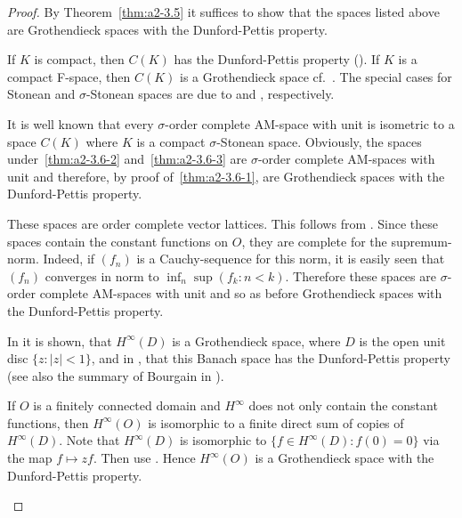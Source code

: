 \begin{proof}
By Theorem~\ref{thm:a2-3.5}   it suffices to show that the spaces listed above are Grothendieck spaces with the Dunford-Pettis property.
\begin{description}[style=standard, wide, labelindent=.25em]
		
\item[\ref{thm:a2-3.6-1}] 
	If\/ $K$ is compact, then $C(K)$ has the Dunford-Pettis property (\cf \textcite[Théorème 4]{grothendieck:1953}).
	If\/ $K$ is a compact F-space, then $C(K)$ is a Grothendieck space cf.~\textcite[Theorem 2.5]{seever:1968}. 
	The special cases for Stonean and $\sigma$-Stonean spaces are due to \textcite[Théorème 9]{grothendieck:1953} and \textcite{ando:1961},  respectively.
		
\item[\ref{thm:a2-3.6-2} and~\ref{thm:a2-3.6-3} ] It is well known that every $\sigma$-order complete AM-space with unit is isometric to a space $C(K)$ where $K$ is a compact $\sigma$-Stonean space.
Obviously, the spaces under~\ref{thm:a2-3.6-2}   and~\ref{thm:a2-3.6-3}  are $\sigma$-order complete AM-spaces with unit and therefore, by proof of~\ref{thm:a2-3.6-1}, are  Grothendieck spaces with the Dunford-Pettis property.
		
\item[\ref{thm:a2-3.6-4} and~\ref{thm:a2-3.6-5}] These spaces are order complete vector lattices.
This follows from \textcite[pp.18-22, Standardbeispiele 1 and 2 p.55]{bauer:1966}.
Since these spaces contain the constant functions on $O$, they are complete for the supremum-norm.
Indeed, if\/ $(f_n)$ is a Cauchy-sequence for this norm, it is easily seen that $(f_n)$ converges in norm to $\inf_n \sup(f_k \colon n < k)$.
Therefore these spaces are $\sigma$-order complete AM-spaces with unit and so as before Grothendieck spaces with the Dunford-Pettis property.
		
\item[\ref{thm:a2-3.6-6}] In \textcite{bourgain:1982} it is shown, that $H^{\infty}(D)$ is a Grothendieck space, where $D$ is the open unit disc $\{z \colon |z| < 1\}$, and in \textcite{bourgain:1984}, that this Banach space has the Dunford-Pettis property (see also the summary of Bourgain in \textcite{blei:1983}).
		
If\/ $O$ is a finitely connected domain and $H^{\infty}$ does not only contain the constant functions, then $H^{\infty}(O)$ is isomorphic to a finite direct sum of copies of\/ $H^{\infty}(D)$.
Note that $H^{\infty}(D)$ is isomorphic to $\{f \in H^{\infty}(D) \colon f(0) = 0\}$ via the map $f \mapsto zf$.
Then use \textcite[p.77 and Proposition 4.4.1]{grothendieck:1953}.
Hence $H^{\infty}(O)$ is a Grothendieck space with the Dunford-Pettis property.
		
\end{description}
	
\end{proof}

